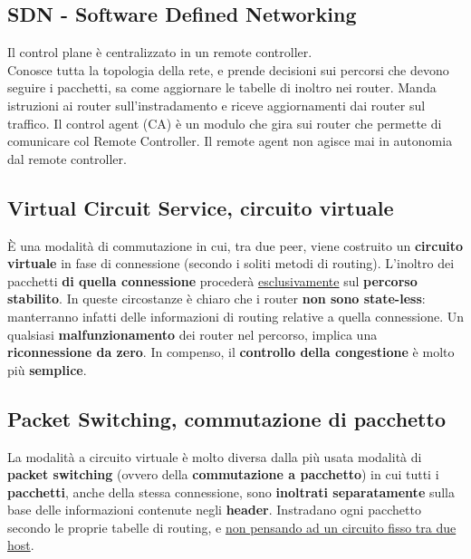 \subsection{SDN - Software Defined Networking}
Il control plane è centralizzato in un remote controller.\\
Conosce tutta la topologia della rete, e prende decisioni sui percorsi che devono seguire i pacchetti, sa come aggiornare le tabelle di inoltro nei router. Manda istruzioni ai router sull'instradamento e riceve aggiornamenti dai router sul traffico. Il control agent (CA) è un modulo che gira sui router che permette di comunicare col Remote Controller. Il remote agent non agisce mai in autonomia dal remote controller.

\subsection{Virtual Circuit Service, circuito virtuale}
È una modalità di commutazione in cui, tra due peer, viene costruito un \textbf{circuito virtuale} in fase di connessione (secondo i soliti metodi di routing). L'inoltro dei pacchetti \textbf{di quella connessione} procederà \underline{esclusivamente} sul \textbf{percorso stabilito}. In queste circostanze è chiaro che i router \textbf{non sono state-less}: manterranno infatti delle informazioni di routing relative a quella connessione. Un qualsiasi \textbf{malfunzionamento} dei router nel percorso, implica una \textbf{riconnessione da zero}. In compenso, il \textbf{controllo della congestione} è molto più \textbf{semplice}. 

\subsection{Packet Switching, commutazione di pacchetto}
La modalità a circuito virtuale è molto diversa dalla più usata modalità di \textbf{packet switching} (ovvero della \textbf{commutazione a pacchetto}) in cui tutti i \textbf{pacchetti}, anche della stessa connessione, sono \textbf{inoltrati separatamente} sulla base delle informazioni contenute negli \textbf{header}. Instradano ogni pacchetto secondo le proprie tabelle di routing, e \underline{non pensando ad un circuito fisso tra due host}.


